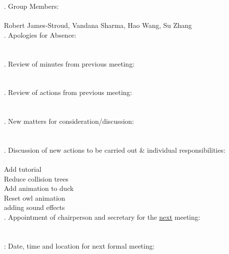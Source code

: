 \documentclass{article}
\begin{document}
. Group Members: \\\\ \indent Robert James-Stroud, Vandana Sharma, Hao Wang, Su Zhang \\

. Apologies for Absence: \\\\ \indent   \\

. Review of minutes from previous meeting: \\\\ \indent  \\

. Review of actions from previous meeting: \\\\ \indent \\

. New matters for consideration/discussion: \\\\ \indent  \\

. Discussion of new actions to be carried out \& individual responsibilities: \\\\ \indent Add tutorial \\ \indent Reduce collision trees \\ \indent Add animation to duck \\ \indent Reset owl animation \\ \indent adding sound effects\\

. Appointment of chairperson and secretary for the \underline{next} meeting: \\\\ 
\indent  \\

: Date, time and location for next formal meeting: \\\\ \indent  \\
\end{document}

